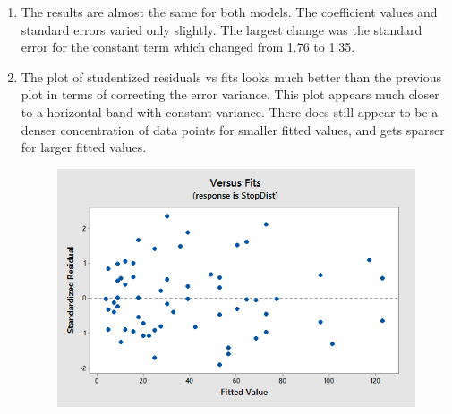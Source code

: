 \documentclass{article}
\begin{document}
\begin{enumerate}
\def\labelenumi{\alph{enumi})}
\setcounter{enumi}{4}
\item
  The results are almost the same for both models. The coefficient
  values and standard errors varied only slightly. The largest change
  was the standard error for the constant term which changed from 1.76
  to 1.35.
\item
  The plot of studentized residuals vs fits looks much better than the
  previous plot in terms of correcting the error variance. This plot
  appears much closer to a horizontal band with constant variance. There
  does still appear to be a denser concentration of data points for
  smaller fitted values, and gets sparser for larger fitted values.
  
  \begin{figure}[h!]
 \centering
 \includegraphics[scale=0.5]{./images/plot-standardized-residuals-vs-fits_stopDist-vs-spdmn19-and-spdsqrd.png}
\end{figure}

\end{enumerate}


    
    
    
    
\end{document}
